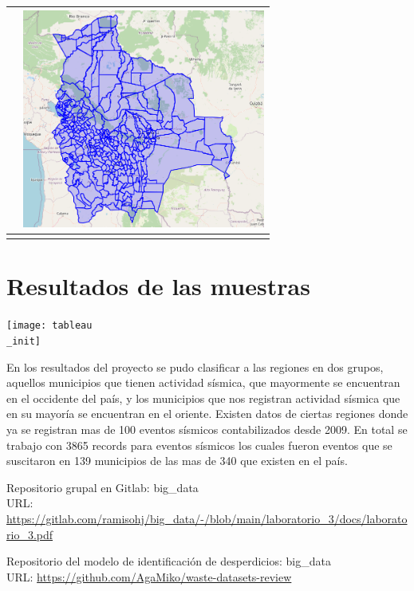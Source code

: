 \documentclass[12pt]{article}
\begin{document}
\begin{center}
\begin{tabular}{c c}
	&
  	\includegraphics[width=8cm]{adm3}
	\\[1ex]
	\hline\hline & \\[-1.5ex]
\end{tabular}
\end{center}

\section{Resultados de las muestras}

\begin{center}
  \texttt{[image: tableau\\\_init]}
\end{center}

En los resultados del proyecto se pudo clasificar a las regiones en dos grupos, aquellos municipios que tienen actividad sísmica, que mayormente se encuentran en el occidente del país, y los municipios que nos registran actividad sísmica que en su mayoría se encuentran en el oriente.
Existen datos de ciertas regiones donde ya se registran mas de 100 eventos sísmicos contabilizados desde 2009. En total se trabajo con 3865 records para eventos sísmicos los cuales fueron eventos que se suscitaron en 139 municipios de las mas de 340 que existen en el país.







\begin{thebibliography}{00}

 Repositorio grupal en Gitlab: big\_data\\
URL: {\url{https://gitlab.com/ramisohj/big_data/-/blob/main/laboratorio_3/docs/laboratorio_3.pdf}}

 Repositorio del modelo de identificación de desperdicios: big\_data\\
URL: {\url{https://github.com/AgaMiko/waste-datasets-review}}
\end{thebibliography}
\end{document}
